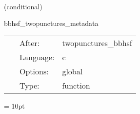 \vspace{5mm}

   (conditional) 

\hspace{5mm} bbhsf\_twopunctures\_metadata 

\hspace{5mm}{\it output twopunctures metadata } 


\hspace{5mm}

 \begin{tabular*}{160mm}{cll} 
~ & After:  & twopunctures\_bbhsf \\ 
~ & Language:  & c \\ 
~ & Options:  & global \\ 
~ & Type:  & function \\ 
\end{tabular*} 



\vspace{5mm}\parskip = 10pt 

